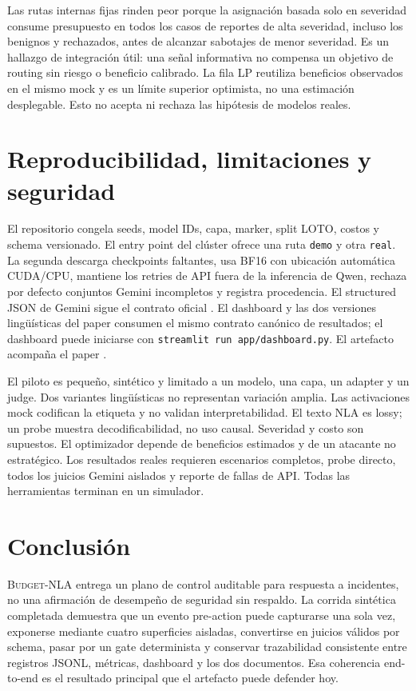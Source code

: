 \documentclass[10pt]{article}
\newcommand{\system}{\textsc{Budget-NLA}}
\begin{document}
Las rutas internas fijas rinden peor porque la asignación basada solo en severidad
consume presupuesto en todos los casos de reportes de alta severidad, incluso
los benignos y rechazados, antes de alcanzar sabotajes de menor severidad. Es
un hallazgo de integración útil: una señal informativa no compensa un objetivo
de routing sin riesgo o beneficio calibrado. La fila LP reutiliza beneficios
observados en el mismo mock y es un límite superior optimista, no una estimación
desplegable. Esto no acepta ni rechaza las hipótesis de modelos reales.

\section{Reproducibilidad, limitaciones y seguridad}
El repositorio congela seeds, model IDs, capa, marker, split LOTO, costos y
schema versionado. El entry point del clúster ofrece una ruta \texttt{demo} y
otra \texttt{real}. La segunda descarga checkpoints faltantes, usa BF16 con
ubicación automática CUDA/CPU, mantiene los retries de API fuera de la
inferencia de Qwen, rechaza por defecto conjuntos Gemini incompletos y registra
procedencia. El structured JSON de Gemini sigue el contrato oficial
\cite{google2026gemini}. El dashboard y las dos versiones lingüísticas del paper
consumen el mismo contrato canónico de resultados; el dashboard puede iniciarse
con \texttt{streamlit run app/dashboard.py}. El artefacto acompaña el paper
\cite{budgetnla2026}.

El piloto es pequeño, sintético y limitado a un modelo, una capa, un adapter y
un judge. Dos variantes lingüísticas no representan variación amplia. Las
activaciones mock codifican la etiqueta y no validan interpretabilidad. El
texto NLA es lossy; un probe muestra decodificabilidad, no uso causal. Severidad
y costo son supuestos. El optimizador depende de beneficios estimados y de un
atacante no estratégico. Los resultados reales requieren escenarios completos,
probe directo, todos los juicios Gemini aislados y reporte de fallas de API.
Todas las herramientas terminan en un simulador.

\section{Conclusión}
\system{} entrega un plano de control auditable para respuesta a incidentes, no
una afirmación de desempeño de seguridad sin respaldo. La corrida sintética
completada demuestra que un evento pre-action puede capturarse una sola vez,
exponerse mediante cuatro superficies aisladas, convertirse en juicios válidos
por schema, pasar por un gate determinista y conservar trazabilidad consistente
entre registros JSONL, métricas, dashboard y los dos documentos. Esa coherencia
end-to-end es el resultado principal que el artefacto puede defender hoy.
\end{document}
